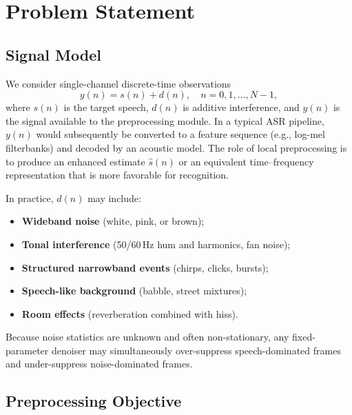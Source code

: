 \section{Problem Statement}
\label{sec:problem}

\subsection{Signal Model}

We consider single-channel discrete-time observations
\begin{equation}
  y(n) = s(n) + d(n), \quad n = 0, 1, \ldots, N-1,
  \label{eq:signal_model}
\end{equation}
where $s(n)$ is the target speech, $d(n)$ is additive interference, and $y(n)$ is the signal available to the preprocessing module. In a typical ASR pipeline, $y(n)$ would subsequently be converted to a feature sequence (e.g., log-mel filterbanks) and decoded by an acoustic model. The role of local preprocessing is to produce an enhanced estimate $\hat{s}(n)$ or an equivalent time--frequency representation that is more favorable for recognition.

In practice, $d(n)$ may include:
\begin{itemize}
  \item \textbf{Wideband noise} (white, pink, or brown);
  \item \textbf{Tonal interference} (50/60\,Hz hum and harmonics, fan noise);
  \item \textbf{Structured narrowband events} (chirps, clicks, bursts);
  \item \textbf{Speech-like background} (babble, street mixtures);
  \item \textbf{Room effects} (reverberation combined with hiss).
\end{itemize}
Because noise statistics are unknown and often non-stationary, any fixed-parameter denoiser may simultaneously over-suppress speech-dominated frames and under-suppress noise-dominated frames.

\subsection{Preprocessing Objective}

